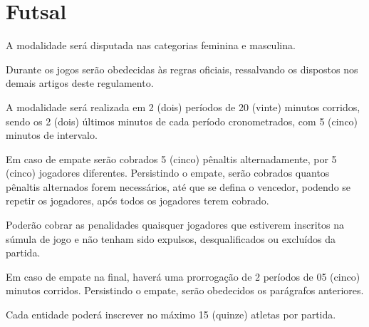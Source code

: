 {\let\clearpage\relax \chapter{Futsal}}

\begin{article}
	A modalidade será disputada nas categorias feminina e masculina.
\end{article}

\begin{article}
	Durante os jogos serão obedecidas às regras oficiais, ressalvando os dispostos nos demais artigos deste regulamento.
\end{article}

\begin{article}
	A modalidade será realizada em 2 (dois) períodos de 20 (vinte) minutos corridos, sendo os 2 (dois) últimos minutos de cada período cronometrados, com 5 (cinco) minutos de intervalo.

	\begin{xparagraph}
		Em caso de empate serão cobrados 5 (cinco) pênaltis alternadamente, por 5 (cinco) jogadores diferentes. Persistindo o empate, serão cobrados quantos pênaltis alternados forem necessários, até que se defina o vencedor, podendo se repetir os jogadores, após todos os jogadores terem cobrado.
	\end{xparagraph}

	\begin{xparagraph}
		Poderão cobrar as penalidades quaisquer jogadores que estiverem inscritos na súmula de jogo e não tenham sido expulsos, desqualificados ou excluídos da partida.
	\end{xparagraph}

	\begin{xparagraph}
		Em caso de empate na final, haverá uma prorrogação de 2 períodos de 05 (cinco) minutos corridos. Persistindo o empate, serão obedecidos os parágrafos anteriores.
	\end{xparagraph}
\end{article}

\begin{article}
	Cada entidade poderá inscrever no máximo 15 (quinze) atletas por partida.
\end{article}
